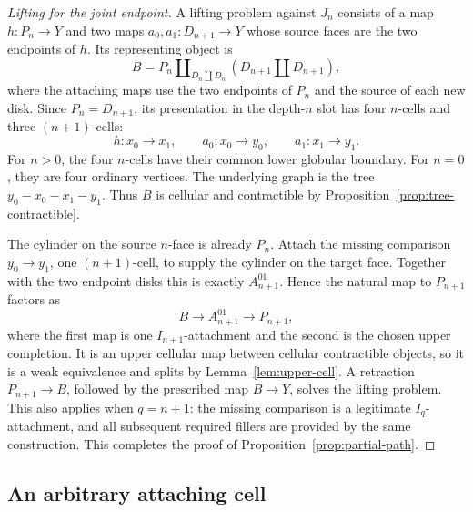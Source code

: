 \begin{proof}[Lifting for the joint endpoint]
A lifting problem against \(J_n\) consists of a map
\(h:P_n\to Y\) and two maps \(a_0,a_1:D_{n+1}\to Y\)
whose source faces are the two endpoints of \(h\).  Its representing
object is
\begin{equation}\label{eq:partial-path-tree-domain}
 B=P_n\amalg_{D_n\amalg D_n}(D_{n+1}\amalg D_{n+1}),
\end{equation}
where the attaching maps use the two endpoints of \(P_n\) and
the source of each new disk.  Since \(P_n=D_{n+1}\), its
presentation in the depth-\(n\) slot has four \(n\)-cells and
three \((n+1)\)-cells:
\[
 h:x_0\longrightarrow x_1,\qquad
 a_0:x_0\longrightarrow y_0,\qquad
 a_1:x_1\longrightarrow y_1.
\]
For \(n>0\), the four \(n\)-cells have their common lower
globular boundary.  For \(n=0\), they are four ordinary vertices.
The underlying graph is the tree \(y_0-x_0-x_1-y_1\).
Thus \(B\) is cellular and contractible by
Proposition~\ref{prop:tree-contractible}.



The cylinder on the source \(n\)-face is already \(P_n\).
Attach the missing comparison \(y_0\to y_1\), one
\((n+1)\)-cell, to supply the cylinder on the target face.  Together
with the two endpoint disks this is exactly
\(A_{n+1}^{01}\).  Hence the natural map to \(P_{n+1}\)
factors as
\[
                 B\longrightarrow A_{n+1}^{01}
                        \longrightarrow P_{n+1},
\]
where the first map is one \(I_{n+1}\)-attachment and the second
is the chosen upper completion.  It is an upper cellular map between
cellular contractible objects, so it is a weak equivalence and splits
by Lemma~\ref{lem:upper-cell}.  A retraction
\(P_{n+1}\to B\), followed by the prescribed map \(B\to Y\),
solves the lifting problem.  This also applies when \(q=n+1\):
the missing comparison is a legitimate \(I_q\)-attachment, and
all subsequent required fillers are provided by the same construction.
This completes the proof of Proposition~\ref{prop:partial-path}.
\end{proof}

\subsection{An arbitrary attaching cell}

